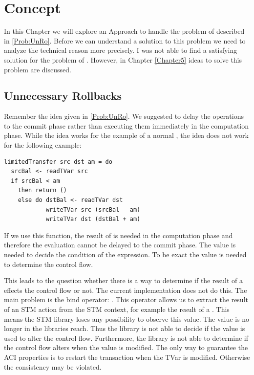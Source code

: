 
\chapter{Concept} %

\label{Chapter2} %

In this Chapter we will explore an Approach to handle the problem of  described in \ref{Prob:UnRo}.
Before we can understand a solution to this problem we need to analyze the technical reason more precisely. 
I was not able to find a satisfying solution for the problem of . However, in 
Chapter \ref{Chapter5} ideas to solve this problem are discussed.

\section{Unnecessary Rollbacks}
Remember the idea given in \ref{Prob:UnRo}. We suggested to delay the  operations to the commit
phase rather than executing them immediately in the computation
phase. While the idea works for the example of a normal , the idea does not work 
for the following example:
\begin{lstlisting}
limitedTransfer src dst am = do 
  srcBal <- readTVar src
  if srcBal < am
    then return ()
    else do dstBal <- readTVar dst
            writeTVar src (srcBal - am)
            writeTVar dst (dstBal + am)
\end{lstlisting}
If we use this function, the result of  is needed in the computation phase and therefore 
the evaluation cannot be delayed to the commit phase. The value is needed to decide the condition of the 
 expression. To be exact the value is needed to determine the control flow. 

This leads to the question whether there is a way to determine if the result of a  effects the 
control flow or not. The current implementation does not do this. The main problem is the bind
operator: . This operator allows us to extract the result of an STM action 
from the STM context, for example the result of a . This means the STM library loses any possibility to 
observe this value. The value is no longer in the libraries reach. Thus the library is not able to decide if 
the value is used to alter the control flow. Furthermore, the library is not able to determine if the control
flow alters when the value is modified. The only way to guarantee the ACI properties is to restart the 
transaction when the TVar is modified. Otherwise the consistency may be violated.


